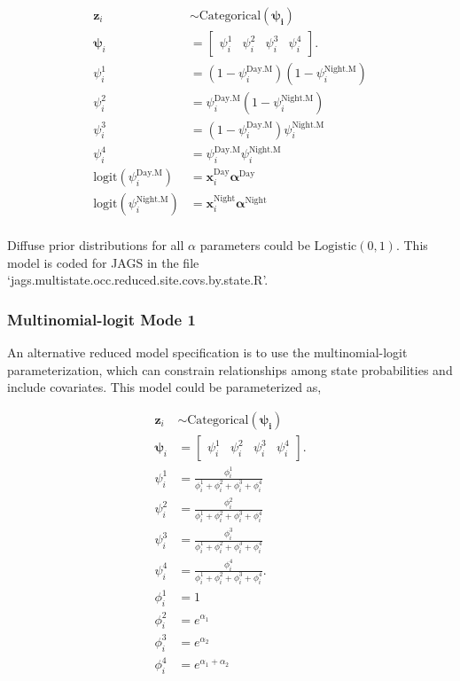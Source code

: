 \documentclass[12pt]{article}
\begin{document}
\begin{center}
\begin{align*}
\textbf{z}_{i} &\sim \text{Categorical}(\boldsymbol{\psi_{i}})\\
\boldsymbol{\psi}_{i} &= \begin{bmatrix} \psi^1_{i} & \psi^2_{i} & \psi^3_{i} & \psi^4_{i} \end{bmatrix}.\\
\psi^1_{i} &=(1-\psi^{\text{Day.M}}_{i})(1-\psi^{\text{Night.M}}_{i})\\%
\psi^2_{i} &=\psi^{\text{Day.M}}_{i}(1-\psi^{\text{Night.M}}_{i})\\
\psi^3_{i} &=(1-\psi^{\text{Day.M}}_{i})\psi^{\text{Night.M}}_{i}\\
\psi^4_{i} &=\psi^{\text{Day.M}}_{i}\psi^{\text{Night.M}}_{i}\\
\text{logit}(\psi^{\text{Day.M}}_{i}) &= \textbf{x}_{i}^{\text{Day}}\boldsymbol{\alpha}^{\text{Day}}\\
\text{logit}(\psi^{\text{Night.M}}_{i}) &= \textbf{x}_{i}^{\text{Night}}\boldsymbol{\alpha}^{\text{Night}}\\
\end{align*}
\end{center}
Diffuse prior distributions for all $\alpha$ parameters could be $\text{Logistic}(0,1)$. This model is coded for JAGS in the file `jags.multistate.occ.reduced.site.covs.by.state.R'.

\subsubsection{Multinomial-logit Mode 1}
An alternative reduced model specification is to use the multinomial-logit parameterization, which can constrain relationships among state probabilities and include covariates. This model could be parameterized as, 
\begin{center}
\begin{align*}
\textbf{z}_{i} &\sim \text{Categorical}(\boldsymbol{\psi_{i}})\\
\boldsymbol{\psi}_{i} &= \begin{bmatrix} \psi^1_{i} & \psi^2_{i} & \psi^3_{i} & \psi^4_{i} \end{bmatrix}.\\
\psi^1_{i} &=\frac{\phi^1_{i}}{\phi^1_{i}+ \phi^2_{i}+\phi^3_{i}+\phi^4_{i}}\\
\psi^2_{i} &=\frac{\phi^2_{i}}{\phi^1_{i}+ \phi^2_{i}+\phi^3_{i}+\phi^4_{i}}\\
\psi^3_{i} &=\frac{\phi^3_{i}}{\phi^1_{i}+ \phi^2_{i}+\phi^3_{i}+\phi^4_{i}}\\
\psi^4_{i} &=\frac{\phi^4_{i}}{\phi^1_{i}+ \phi^2_{i}+\phi^3_{i}+\phi^4_{i}}.\\
\phi^1_{i} &= 1\\
\phi^2_{i} &= e^{\alpha_{1}}\\
\phi^3_{i} &= e^{\alpha_{2}}\\
\phi^4_{i} &= e^{\alpha_{1}+\alpha_{2}}\\
\end{align*}
\end{center}
\end{document}

